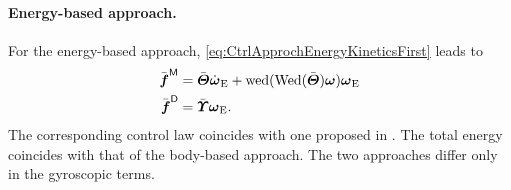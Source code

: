 \paragraph{Energy-based approach.}
For the energy-based approach, \eqref{eq:CtrlApprochEnergyKineticsFirst} leads to
\begin{subequations}
\begin{align}
 \bar{\boldsymbol{f}}^{\mathsf{M}} &= \bar{\boldsymbol{\varTheta}} \dot{\boldsymbol{\omega}}_{\mathrm{E}} + \operatorname{wed}(\operatorname{Wed}(\bar{\boldsymbol{\varTheta}}) \boldsymbol{\omega}) \boldsymbol{\omega}_{\mathrm{E}}
\\
 \bar{\boldsymbol{f}}^{\mathsf{D}} &= \bar{\boldsymbol{\varUpsilon}} \boldsymbol{\omega}_{\mathrm{E}}.
\end{align} 
\end{subequations}
The corresponding control law coincides with one proposed in \cite{Bullo:TrackingAutomatica}.
The total energy coincides with that of the body-based approach.
The two approaches differ only in the gyroscopic terms.


